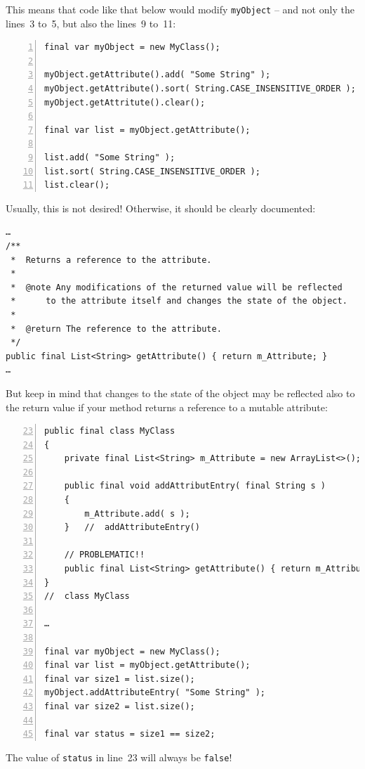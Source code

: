 \documentclass[11pt,a4paper, titlepage, parskip=half, headsepline, footsepline, cleardoublepage=current, headheight=1cm]{scrbook}
\begin{document}
This means that code like that below would modify \lstinline|myObject| – and not only the lines~3 to~5, but also the lines~9 to~11:
\begin{lstlisting}[numbers=left]
final var myObject = new MyClass();

myObject.getAttribute().add( "Some String" );
myObject.getAttribute().sort( String.CASE_INSENSITIVE_ORDER );
myObject.getAttritute().clear();

final var list = myObject.getAttribute();

list.add( "Some String" );
list.sort( String.CASE_INSENSITIVE_ORDER );
list.clear();
\end{lstlisting}
Usually, this is not desired! Otherwise, it should be clearly documented: 
\begin{lstlisting}
…
/**
 *  Returns a reference to the attribute.
 * 
 *  @note Any modifications of the returned value will be reflected 
 *      to the attribute itself and changes the state of the object.
 * 
 *  @return The reference to the attribute.
 */ 
public final List<String> getAttribute() { return m_Attribute; }
…
\end{lstlisting}

But keep in mind that changes to the state of the object may be reflected also to the return value if your method returns a reference to a mutable attribute:
\begin{lstlisting}[numbers=left,firstnumber=23]
public final class MyClass
{
    private final List<String> m_Attribute = new ArrayList<>();

    public final void addAttributEntry( final String s )
    {
        m_Attribute.add( s );
    }   //  addAttributeEntry()
    
    // PROBLEMATIC!!    
    public final List<String> getAttribute() { return m_Attribute; }
}
//  class MyClass    

…

final var myObject = new MyClass();
final var list = myObject.getAttribute();
final var size1 = list.size();
myObject.addAttributeEntry( "Some String" );
final var size2 = list.size();

final var status = size1 == size2;
\end{lstlisting}
The value of \lstinline|status| in line~23 will always be \lstinline|false|!
\end{document}
